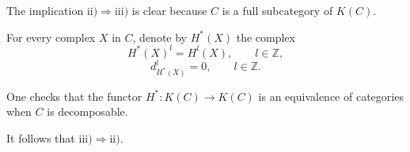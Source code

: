 The implication $\mathrm{ii)}\Longrightarrow\mathrm{iii)}$ is clear because
$C$ is a full subcategory of $K(C)$.

For every complex $X$ in $C$, denote by $H^*(X)$ the complex
\[
  H^*(X)^l=H^l(X),\qquad l\in\mathbb Z,
\]
\[
  d_{H^*(X)}^l=0,\qquad l\in\mathbb Z.
\]

One checks that the functor
$H^*\colon K(C)\longrightarrow K(C)$ is an equivalence of categories when
$C$ is decomposable.

It follows that
$\mathrm{iii)}\Longrightarrow\mathrm{ii)}$.
\endgroup
